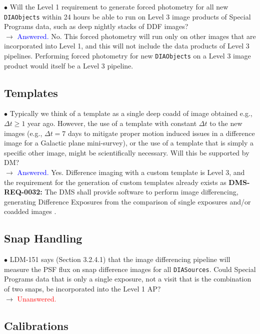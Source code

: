 \documentclass[DM,lsstdraft,toc]{lsstdoc}
\begin{document}
$\bullet$ Will the Level 1 requirement to generate forced photometry for all new {\tt DIAObjects} within 24 hours be able to run on Level 3 image products of Special Programs data, such as deep nightly stacks of DDF images? \\
$\rightarrow$ \textcolor{blue}{Answered.} No. This forced photometry will run only on other images that are incorporated into Level 1, and this will not include the data products of Level 3 pipelines. Performing forced photometry for new {\tt DIAObjects} on a Level 3 image product would itself be a Level 3 pipeline.


\subsection{Templates}\label{ssec:issues_templates}

$\bullet$ Typically we think of a template as a single deep coadd of image obtained e.g., $\Delta t \geq 1$ year ago. However, the use of a template with constant $\Delta t$ to the new images (e.g., $\Delta t = 7$ days to mitigate proper motion induced issues in a difference image for a Galactic plane mini-survey), or the use of a template that is simply a specific other image, might be scientifically necessary. Will this be supported by DM? \\
$\rightarrow$ \textcolor{blue}{Answered.} Yes. Difference imaging with a custom template is Level 3, and the requirement for the generation of custom templates already exists as \textbf{DMS-REQ-0032:} The DMS shall provide software to perform image differencing, generating Difference Exposures from the comparison of single exposures and/or coadded images \citep{LSE-61}.


\subsection{Snap Handling}\label{ssec:issues_snaps}

$\bullet$ LDM-151 says (Section 3.2.4.1) that the image differencing pipeline will measure the PSF flux on snap difference images for all {\tt DIASources}. Could Special Programs data that is only a single exposure, not a visit that is the combination of two snaps, be incorporated into the Level 1 AP? \\
$\rightarrow$ \textcolor{red}{Unanswered.} 


\subsection{Calibrations}\label{ssec:issues_calibrations}
\end{document}
